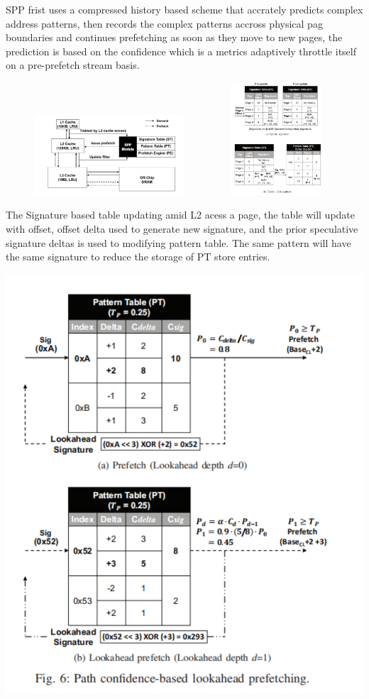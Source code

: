 \documentclass[letterpaper,12pt]{article}
\begin{document}
SPP frist uses a compressed history based scheme that accrately predicts complex address patterns, then records the complex patterns accross physical pag boundaries and continues prefetching as soon as they move to new pages, the prediction is based on the confidence which is a metrics adaptively throttle itself on a pre-prefetch stream basis.

\begin{figure}[h]
  \centering
  \includegraphics[width=0.5\textwidth]{spp.png}
  $\qquad \qquad$
  \includegraphics[width=0.3\textwidth]{pattern.png}
\end{figure}
The Signature based table updating amid L2 acess a page, the table will update with offset, offset delta used to generate new signature, and the prior speculative signature deltas is used to modifying pattern table. The same pattern will have the same signature to reduce the storage of PT store entries.
\begin{center}
  \includegraphics[width=\textwidth]{lookahead.png}
\end{center}
\end{document}
